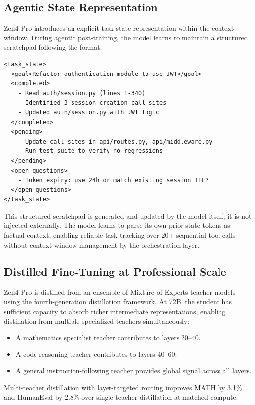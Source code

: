 \documentclass[11pt,a4paper]{article}
\begin{document}
\subsection{Agentic State Representation}

Zen4-Pro introduces an explicit task-state representation within the context window. During
agentic post-training, the model learns to maintain a structured scratchpad following the
format:

\begin{lstlisting}[caption=Agentic State Token Format]
<task_state>
  <goal>Refactor authentication module to use JWT</goal>
  <completed>
    - Read auth/session.py (lines 1-340)
    - Identified 3 session-creation call sites
    - Updated auth/session.py with JWT logic
  </completed>
  <pending>
    - Update call sites in api/routes.py, api/middleware.py
    - Run test suite to verify no regressions
  </pending>
  <open_questions>
    - Token expiry: use 24h or match existing session TTL?
  </open_questions>
</task_state>
\end{lstlisting}

This structured scratchpad is generated and updated by the model itself; it is not injected
externally. The model learns to parse its own prior state tokens as factual context, enabling
reliable task tracking over 20+ sequential tool calls without context-window management by
the orchestration layer.

\subsection{Distilled Fine-Tuning at Professional Scale}

Zen4-Pro is distilled from an ensemble of Mixture-of-Experts teacher models using the fourth-generation
distillation framework. At 72B, the student has sufficient capacity to absorb richer intermediate
representations, enabling distillation from multiple specialized teachers simultaneously:

\begin{itemize}
    \item A mathematics specialist teacher contributes to layers 20--40.
    \item A code reasoning teacher contributes to layers 40--60.
    \item A general instruction-following teacher provides global signal across all layers.
\end{itemize}

Multi-teacher distillation with layer-targeted routing improves MATH by 3.1\% and HumanEval
by 2.8\% over single-teacher distillation at matched compute.
\end{document}
